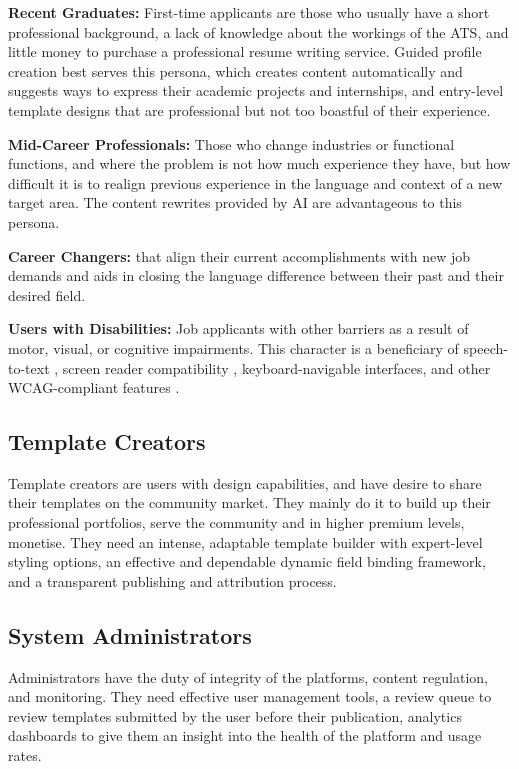 \documentclass[12pt, a4paper, oneside]{report}
\begin{document}
\textbf{Recent Graduates:} First-time applicants are those who usually have a short professional background, a lack of knowledge about the workings of the ATS, and little money to purchase a professional resume writing service. Guided profile creation best serves this persona, which creates content automatically and suggests ways to express their academic projects and internships, and entry-level template designs that are professional but not too boastful of their experience.

\textbf{Mid-Career Professionals:} Those who change industries or functional functions, and where the problem is not how much experience they have, but how difficult it is to realign previous experience in the language and context of a new target area. The content rewrites provided by AI are advantageous to this persona.

\textbf{Career Changers:} \cite{gemini2023} that align their current accomplishments with new job demands and aids in closing the language difference between their past and their desired field.

\textbf{Users with Disabilities:} Job applicants with other barriers as a result of motor, visual, or cognitive impairments. This character is a beneficiary of speech-to-text \cite{sears2003}, screen reader compatibility \cite{waiaria2023}, keyboard-navigable interfaces, and other WCAG-compliant features \cite{wcag21}.

\subsection{Template Creators}

Template creators are users with design capabilities, and have desire to share their templates on the community market. They mainly do it to build up their professional portfolios, serve the community and in higher premium levels, monetise. They need an intense, adaptable template builder with expert-level styling options, an effective and dependable dynamic field binding framework, and a transparent publishing and attribution process.

\subsection{System Administrators}

Administrators have the duty of integrity of the platforms, content regulation, and monitoring. They need effective user management tools, a review queue to review templates submitted by the user before their publication, analytics dashboards to give them an insight into the health of the platform and usage rates.
\end{document}
